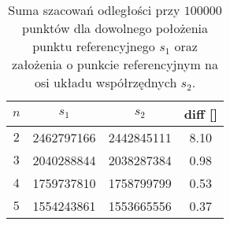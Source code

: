 \begin{table}[h]
	\centering
	\begin{tabular}{ c | c | c | c |}
		$ n $ & $ s_1 $ & $ s_2 $ & diff [\permil] \\ \hline
		$ 2 $ & 2462797166 & 2442845111 & 8.10  \\ \hline
		$ 3 $ & 2040288844 & 2038287384 & 0.98 \\ \hline
		$ 4 $ & 1759737810 & 1758799799 & 0.53 \\ \hline
		$ 5 $ & 1554243861 & 1553665556 & 0.37 \\ \hline
	\end{tabular}
	\caption{Suma szacowań odległości przy $ 100000 $ punktów dla dowolnego położenia punktu referencyjnego $ s_1 $ oraz założenia o punkcie referencyjnym na osi układu współrzędnych $ s_2 $.}\label{ti:with-condition-diff}
\end{table} 